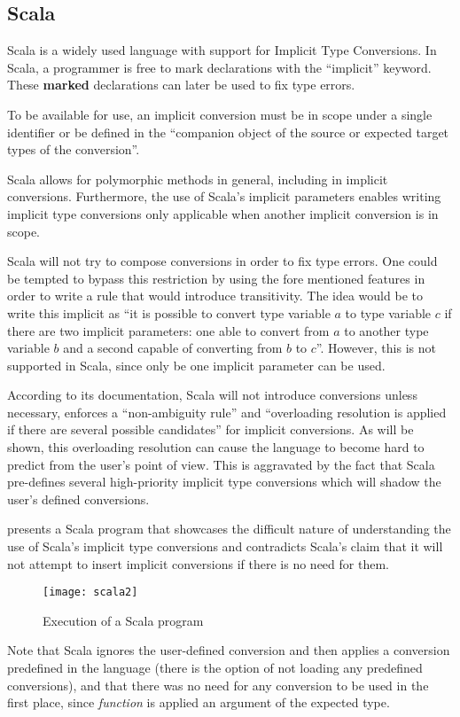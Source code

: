 \subsection{Scala}
\label{scala}

Scala is a widely used language with support for Implicit Type Conversions. In Scala, a programmer is free to mark declarations with the ``implicit'' keyword. These \textbf{marked} declarations can later be used to fix type errors.

To be available for use, an implicit conversion must be in scope under a single identifier or be defined in the ``companion object of  the source or expected target types of the conversion''.

Scala allows for polymorphic methods in general, including in implicit conversions. Furthermore, the use of Scala's implicit parameters enables writing implicit type conversions only applicable when another implicit conversion is in scope. 

Scala will not try to compose conversions in order to fix type errors. One could be tempted to bypass this restriction by using the fore mentioned features in order to write a rule that would introduce transitivity. The idea would be to write this implicit as ``it is possible to convert type variable $a$ to type variable $c$ if there are two implicit parameters: one able to convert from $a$ to another type variable $b$ and a second capable of converting from $b$ to $c$''. However, this is not supported in Scala, since only be one implicit parameter can be used.

According to its documentation, Scala will not introduce conversions unless necessary, enforces a ``non-ambiguity rule'' and ``overloading resolution is applied if there are several possible candidates'' for implicit conversions. As will be shown, this overloading resolution can cause the language to become hard to predict from the user's point of view. This is aggravated by the fact that Scala pre-defines several high-priority implicit type conversions which will shadow the user's defined conversions.

 presents a Scala program that showcases the difficult nature of understanding the use of Scala's implicit type conversions and contradicts Scala's claim that it will not attempt to insert implicit conversions if there is no need for them.

\begin{figure}
  \centering
  
  \texttt{[image: scala2]}
  \caption{Execution of a Scala program}
  \label{scala}
\end{figure}
Note that Scala ignores the user-defined conversion and then applies a conversion predefined in the language (there is the option of not loading any predefined conversions), and that there was no need for any conversion to be used in the first place, since \textit{function} is applied an argument of the expected type.
